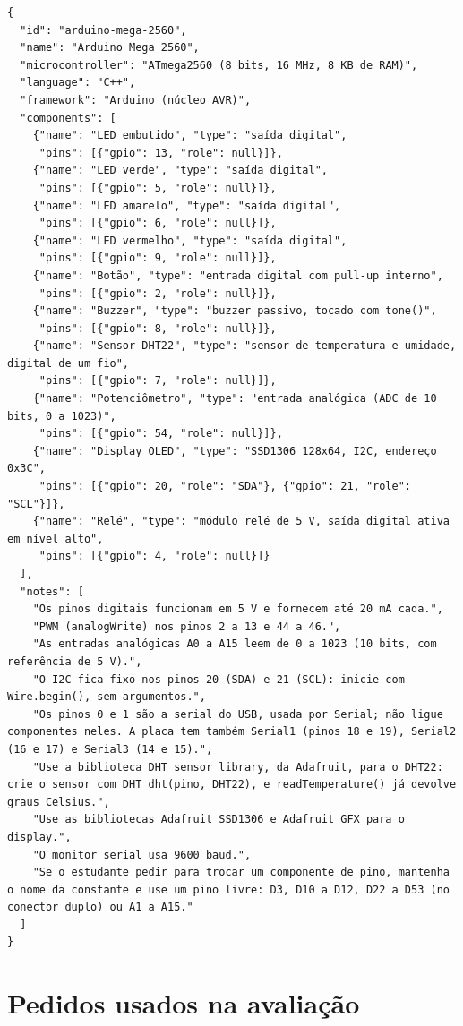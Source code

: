 \begin{apendicesenv}
\begin{lstlisting}
{
  "id": "arduino-mega-2560",
  "name": "Arduino Mega 2560",
  "microcontroller": "ATmega2560 (8 bits, 16 MHz, 8 KB de RAM)",
  "language": "C++",
  "framework": "Arduino (núcleo AVR)",
  "components": [
    {"name": "LED embutido", "type": "saída digital",
     "pins": [{"gpio": 13, "role": null}]},
    {"name": "LED verde", "type": "saída digital",
     "pins": [{"gpio": 5, "role": null}]},
    {"name": "LED amarelo", "type": "saída digital",
     "pins": [{"gpio": 6, "role": null}]},
    {"name": "LED vermelho", "type": "saída digital",
     "pins": [{"gpio": 9, "role": null}]},
    {"name": "Botão", "type": "entrada digital com pull-up interno",
     "pins": [{"gpio": 2, "role": null}]},
    {"name": "Buzzer", "type": "buzzer passivo, tocado com tone()",
     "pins": [{"gpio": 8, "role": null}]},
    {"name": "Sensor DHT22", "type": "sensor de temperatura e umidade, digital de um fio",
     "pins": [{"gpio": 7, "role": null}]},
    {"name": "Potenciômetro", "type": "entrada analógica (ADC de 10 bits, 0 a 1023)",
     "pins": [{"gpio": 54, "role": null}]},
    {"name": "Display OLED", "type": "SSD1306 128x64, I2C, endereço 0x3C",
     "pins": [{"gpio": 20, "role": "SDA"}, {"gpio": 21, "role": "SCL"}]},
    {"name": "Relé", "type": "módulo relé de 5 V, saída digital ativa em nível alto",
     "pins": [{"gpio": 4, "role": null}]}
  ],
  "notes": [
    "Os pinos digitais funcionam em 5 V e fornecem até 20 mA cada.",
    "PWM (analogWrite) nos pinos 2 a 13 e 44 a 46.",
    "As entradas analógicas A0 a A15 leem de 0 a 1023 (10 bits, com referência de 5 V).",
    "O I2C fica fixo nos pinos 20 (SDA) e 21 (SCL): inicie com Wire.begin(), sem argumentos.",
    "Os pinos 0 e 1 são a serial do USB, usada por Serial; não ligue componentes neles. A placa tem também Serial1 (pinos 18 e 19), Serial2 (16 e 17) e Serial3 (14 e 15).",
    "Use a biblioteca DHT sensor library, da Adafruit, para o DHT22: crie o sensor com DHT dht(pino, DHT22), e readTemperature() já devolve graus Celsius.",
    "Use as bibliotecas Adafruit SSD1306 e Adafruit GFX para o display.",
    "O monitor serial usa 9600 baud.",
    "Se o estudante pedir para trocar um componente de pino, mantenha o nome da constante e use um pino livre: D3, D10 a D12, D22 a D53 (no conector duplo) ou A1 a A15."
  ]
}
\end{lstlisting}

\chapter{Pedidos usados na avaliação}
\label{app:evaluation-prompts}


\end{apendicesenv}
